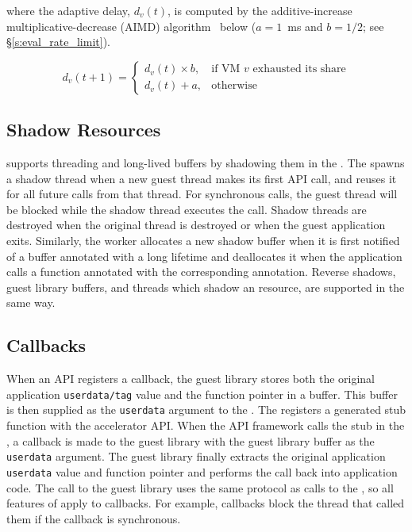 where the adaptive delay, $d_v(t)$, is computed by the additive-increase multiplicative-decrease (AIMD) algorithm~\cite{aimd} below ($a=1$~ms and $b=1/2$; see \S\ref{s:eval_rate_limit}).

\[
d_v\left(t+1\right)=\begin{cases}
d_v\left(t\right)\times b, &\textrm{if VM $v$ exhausted its share}\\
d_v\left(t\right)+a, &\textrm{otherwise}
\end{cases}
\]

\subsection{Shadow Resources}

\AvA supports threading and long-lived buffers by shadowing them in the
\worker. The \worker spawns a shadow thread when a new guest thread makes its
first API call, and reuses it for all future calls from that thread. For
synchronous calls, the guest thread will be blocked while the shadow thread
executes the call. Shadow threads are destroyed when the original thread is
destroyed or when the guest application exits. Similarly, the worker allocates
a new shadow buffer when it is first notified of a buffer annotated with a
long lifetime and deallocates it when the application calls a function
annotated with the corresponding annotation. Reverse shadows, guest library
buffers, and threads which shadow an \worker resource, are supported in the
same way.

\subsection{Callbacks}

When an API registers a callback, the guest library stores both the original
application \texttt{userdata/tag} value and the function pointer in a buffer.
This buffer is then supplied as the \texttt{userdata} argument to the \worker.
The \worker registers a generated stub function with the accelerator API.
When the API framework calls the stub in the \worker, a callback is made to
the guest library with the guest library buffer as the \texttt{userdata}
argument. The guest library finally extracts the original application
\texttt{userdata} value and function pointer and performs the call back into
application code. The call to the guest library uses the same protocol as
calls to the \worker, so all features of \AvA apply to callbacks. For example,
callbacks block the \worker thread that called them if the callback is
synchronous.